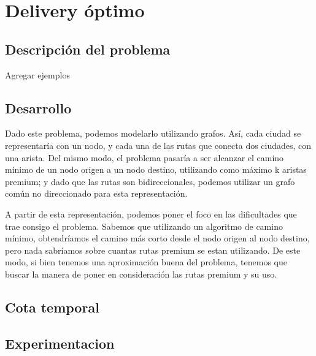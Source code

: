 \section{Delivery óptimo}

\subsection{Descripción del problema}
Agregar ejemplos
\\
\par
\subsection{Desarrollo}
Dado este problema, podemos modelarlo utilizando grafos. Así, cada ciudad se representaría con un nodo, y cada una de las rutas que conecta dos ciudades, con una arista. Del mismo modo, el problema pasaría a ser alcanzar el camino mínimo de un nodo origen a un nodo destino, utilizando como máximo k aristas premium; y dado que las rutas son bidireccionales, podemos utilizar un grafo común no direccionado para esta representación.
\\
\par
A partir de esta representación, podemos poner el foco en las dificultades que trae consigo el problema. Sabemos que utilizando un algoritmo de camino mínimo, obtendríamos el camino más corto desde el nodo origen al nodo destino, pero nada sabríamos sobre cuantas rutas premium se estan utilizando. De este modo, si bien tenemos una aproximación buena del problema, tenemos que buscar la manera de poner en consideración las rutas premium y su uso. 
\\
\par

\subsection{Cota temporal}

\subsection{Experimentacion}



 



